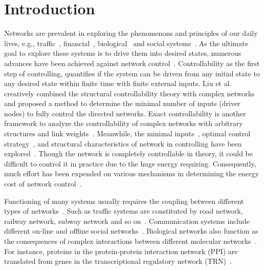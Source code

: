 \documentclass[%
 reprint,
 amsmath,amssymb,
 aps,
]{revtex4-2}
\begin{document}
\section{Introduction}
Networks are prevalent in exploring  the phenomenons and principles of our daily lives, e.g., traffic~\cite{albert2002statistical,newman2003structure}, financial~\cite{mantegna1999introduction,jiang2019multifractal}, biological~\cite{yan2017network,power2011functional,jeong2001lethality,lee2002transcriptional} and social systems~\cite{deng2018peer,wang2013evolution}. As the ultimate goal to explore these systems is to drive them into desired states, numerous advances have been achieved against network control~\cite{liu2011controllability,liu2016control,li2019controlling}. Controllability as the first step of controlling, quantifies if the system can be driven from any initial state to any desired state within finite time with finite external inputs. Liu et al.~\cite{liu2011controllability} creatively combined the structural controllability theory with complex networks and proposed a method to determine the minimal number of inputs (driver nodes) to fully control the directed networks. Exact controllability is another framework to analyze the controllability of complex networks with arbitrary structures and link weights~\cite{yuan2013exact}. Meanwhile, the minimal inputs~\cite{posfai2013effect,xiang2019advances}, optimal control strategy~\cite{gao2014target,xiao2014edge}, and structural characteristics of network in controlling have been explored~\cite{nepusz2012controlling,jia2013emergence,zhao2015intrinsic,wang2015controlling}. Though the network is completely controllable in theory, it could be difficult to control it in practice due to the huge energy requiring. Consequently, much effort has been expended on various mechanisms in determining the energy cost of network control~\cite{yan2012controlling,sun2013controllability,yan2015spectrum,nie2016effect,chen2016energy,lindmark2018minimum,wang2017physical,nie2018control,pasqualetti2014controllability}.

Functioning of many systems usually requires the coupling between different types of networks~\cite{yuan2014exact,nie2015effect,lee2015towards,battiston2014structural,zhu2019investigation}. Such as traffic systems are constituted by road network, railway network, subway network and so on~\cite{sole2016congestion}. Communication systems include different on-line and offline social networks~\cite{mucha2010community,cozzo2013contact}. Biological networks also function as the consequences of complex interactions between different molecular networks~\cite{mahajan2021internetwork,maniatis2002extensive,barabasi2004network,yeger2004network}. For instance, proteins in the protein-protein interaction network (PPI) are translated from genes in the transcriptional regulatory network (TRN)~\cite{mahajan2021internetwork}.
\end{document}
